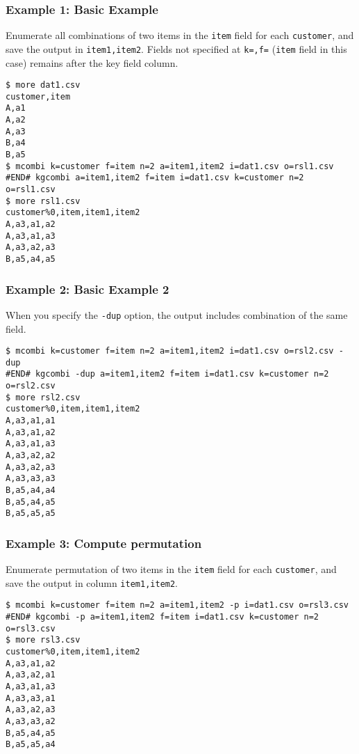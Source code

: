 \subsubsection*{Example 1: Basic Example}

Enumerate all combinations of two items in the \verb|item| field for each \verb|customer|, and save the output in \verb|item1,item2|.  Fields not specified at \verb|k=,f=| (\verb|item| field in this case) remains after the key field column.


\begin{Verbatim}[baselinestretch=0.7,frame=single]
$ more dat1.csv
customer,item
A,a1
A,a2
A,a3
B,a4
B,a5
$ mcombi k=customer f=item n=2 a=item1,item2 i=dat1.csv o=rsl1.csv
#END# kgcombi a=item1,item2 f=item i=dat1.csv k=customer n=2 o=rsl1.csv
$ more rsl1.csv
customer%0,item,item1,item2
A,a3,a1,a2
A,a3,a1,a3
A,a3,a2,a3
B,a5,a4,a5
\end{Verbatim}
\subsubsection*{Example 2: Basic Example 2}

When you specify the \verb|-dup| option, the output includes combination of the same field.


\begin{Verbatim}[baselinestretch=0.7,frame=single]
$ mcombi k=customer f=item n=2 a=item1,item2 i=dat1.csv o=rsl2.csv -dup
#END# kgcombi -dup a=item1,item2 f=item i=dat1.csv k=customer n=2 o=rsl2.csv
$ more rsl2.csv
customer%0,item,item1,item2
A,a3,a1,a1
A,a3,a1,a2
A,a3,a1,a3
A,a3,a2,a2
A,a3,a2,a3
A,a3,a3,a3
B,a5,a4,a4
B,a5,a4,a5
B,a5,a5,a5
\end{Verbatim}
\subsubsection*{Example 3: Compute permutation}

Enumerate permutation of two items in the \verb|item| field for each \verb|customer|, and save the output in column \verb|item1,item2|.


\begin{Verbatim}[baselinestretch=0.7,frame=single]
$ mcombi k=customer f=item n=2 a=item1,item2 -p i=dat1.csv o=rsl3.csv
#END# kgcombi -p a=item1,item2 f=item i=dat1.csv k=customer n=2 o=rsl3.csv
$ more rsl3.csv
customer%0,item,item1,item2
A,a3,a1,a2
A,a3,a2,a1
A,a3,a1,a3
A,a3,a3,a1
A,a3,a2,a3
A,a3,a3,a2
B,a5,a4,a5
B,a5,a5,a4
\end{Verbatim}
